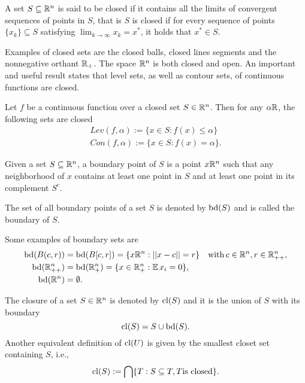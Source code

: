 \documentclass[10pt,a4paper]{article}
\begin{document}
\begin{definition}
	A set $S\subseteq\mathbb{R}^n$ is said to be closed if it contains all the limits of convergent sequences of points in $S$, that is $S$ is closed if for every sequence of points $\{x_k\} \subseteq S$ satisfying $\displaystyle\lim_{k\to \infty} x_k\!=\! x^*$, it holds that $x^*\in S$.
\end{definition}
Examples of closed sets are the closed balls, closed lines segments and the nonnegative orthant $\mathbb{R}_+$. The space $\mathbb{R}^n$ is both closed and open. An important and useful result states that level sets, as well as contour sets, of
continuous functions are closed.
\begin{proposition}
	Let $f$ be a continuous function over a closed set $S\in\mathbb{R}^n$. Then for any $\alpha \mathbb{R}$, the following sets are closed
	\begin{equation*}
		\begin{split}
			Lev(f, \alpha) :=\{x\in S: f(x)\leq \alpha\}\\
			Con(f, \alpha) :=\{x\in S: f(x)= \alpha\}.
		\end{split}
	\end{equation*}
\end{proposition}
\begin{definition}
	Given a set $S\subseteq \mathbb{R}^n$, a boundary point of $S$ is a point $x\mathbb{R}^n$ such that any neighborhood of $x$ contains at least one point in $S$ and at least one point in its complement $S^c$.
\end{definition}
The set of all boundary points of a set $S$ is denoted by $\mathord{\mathrm{bd}}(S)$ and is called the boundary of $S$.
\begin{example}
	Some examples of boundary sets are 
	\begin{equation*}
		\begin{split}
			\mathord{\mathrm{bd}}(B(c,r))&= \mathord{\mathrm{bd}}(B[c,r]) = \{x\mathbb{R}^n: ||x-c||=r\} \quad \mathord{\mathrm{with }}\, c \in \mathbb{R}^n, r \in \mathbb{R}^n_{++},\\
			\mathord{\mathrm{bd}}(\mathbb{R}^n_{++}) &= \mathord{\mathrm{bd}}(\mathbb{R}^n_+) = \{x\in \mathbb{R}^n_+: \operatorname*{\mathbb{E}} x_i = 0\},\\
			\mathord{\mathrm{bd}}(\mathbb{R}^n) &= \emptyset.
		\end{split}
	\end{equation*}
\end{example}
\begin{definition}
	The closure of a set $S\in \mathbb{R}^n$ is denoted by $\mathord{\mathrm{cl}}(S)$ and it is the union of $S$ with its boundary
	\begin{equation*}
		\mathord{\mathrm{cl}}(S)=S \cup \mathord{\mathrm{bd}}(S).
	\end{equation*}
Another equivalent definition of $\mathord{\mathrm{cl}}(U)$ is given by the smallest closet set containing $S$, i.e.,
	\begin{equation*}
		\mathord{\mathrm{cl}}(S):= \bigcap \{T: S \subseteq T, T \text{is closed}\}.
	\end{equation*} 
\end{definition}
\end{document}
